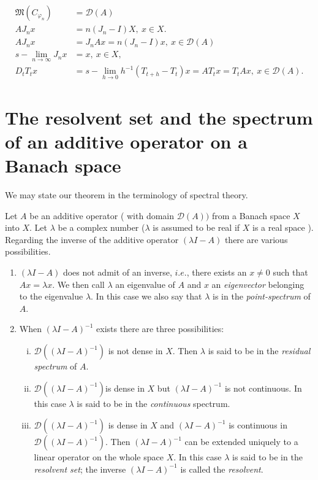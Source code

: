 \begin{coro*}
 \begin{align*}
  \mathfrak{M} ( C_{\varphi_{n}} ) &= \mathscr{D} (A) \\
  A J_n x &= n ( J_n - I ) X, ~ x \in X. \\
  A J_n x &= J_n A x = n (J_n - I ) x, ~ x \in \mathscr{D} (A) \\
  s- \lim_{n \rightarrow \infty} J_n x &= x, ~ x \in X, \\
  D_t T_t x &= s - \lim_{h \rightarrow 0 } h^{-1} ( T_{t+h} - T_t )
  x = A T_t x = T_t A x, ~ x \in \mathscr{D} (A). 
 \end{align*}
\end{coro*}

\section[The resolvent set and...]{The resolvent set and the spectrum of an additive operator on
 a Banach space}\label{chap6:sec1} 

We may state our theorem in the terminology of spectral theory. 

Let $A$ be an additive operator ( with domain $ \mathscr{D} (A) ) $
from a Banach space $X$ into $X$. Let $ \lambda $ be a complex number
($\lambda $ is assumed to be real if $X$ is a real space
). Regarding the inverse of the additive operator $ (\lambda I - A )
$ there are various possibilities. 
\begin{enumerate}[(1)]
\item $ ( \lambda I -A ) $ does not admit of an inverse, $ i.e.$,
 there exists an $ x \neq 0 $ such that $ A x = \lambda x $. We then
 call $ \lambda $ an eigenvalue of $A$ and $x$ an
 \textit{eigenvector} belonging to the eigenvalue $ \lambda $. In
 this case we also say that $ \lambda $ is in the \textit{
  point-spectrum} of $A$. 
\item When $ ( \lambda I - A )^{-1} $ exists there are three
 possibilities: 
 \begin{enumerate}[(i)]
 \item $ \mathscr{D} (( \lambda I - A )^{-1} ) $ is not dense in
  $X$. Then $\lambda$ is said to be in the \textit{residual
  spectrum} of $A$. 
 \item $ \mathscr{D} (( \lambda I - A )^{-1})$\pageoriginale is dense in $ X $
  but $ ( \lambda I - A )^{-1} $ is not continuous. In this case $
  \lambda $ is said to be in the \textit{continuous} spectrum. 
 \item $ \mathscr{D} (( \lambda I - A )^{-1} ) $ is dense in $X$ and
  $ ( \lambda I - A )^{-1} $ is continuous in $ \mathscr{D} ((
  \lambda I - A )^{-1} ) $. Then $ ( \lambda I -A )^{-1} $ can be
  extended uniquely to a linear operator on the whole space $X$. In
  this case $ \lambda $ is said to be in the \textit{ resolvent
   set}; the inverse $ ( \lambda I - A )^{-1} $ is called the
  \textit{resolvent}. 
 \end{enumerate}
\end{enumerate} 

